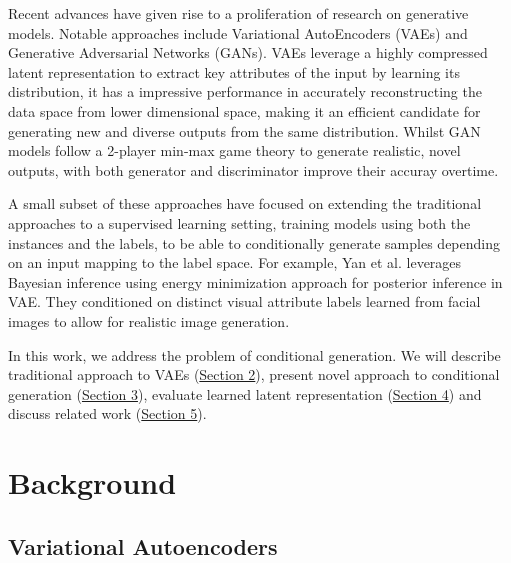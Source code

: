 \documentclass{article}
\begin{document}
 Recent advances have given rise to a proliferation of research on generative models. Notable approaches include Variational AutoEncoders (VAEs) and Generative Adversarial Networks (GANs). VAEs leverage a highly compressed latent representation to extract key attributes of the input by learning its distribution, it has a impressive performance in accurately reconstructing the data space from lower dimensional space, making it an efficient candidate for generating new and diverse outputs from the same distribution. Whilst GAN models follow a 2-player min-max game theory to generate realistic, novel outputs, with both generator and discriminator improve their accuray overtime.\par
A small subset of these approaches have focused on extending the traditional approaches to a supervised learning setting, training models using both the instances and the labels, to be able to conditionally generate samples depending on an input mapping to the label space. For example, Yan et al. leverages Bayesian inference using energy minimization approach for posterior inference in VAE. They conditioned on distinct visual attribute labels learned from facial images to allow for realistic image generation\cite{Yan}.  \par
In this work, we address the problem of conditional generation. We will describe traditional approach to VAEs (\hyperref[sec:background]{Section 2}), present novel approach to conditional generation (\hyperref[sec:proposal]{Section 3}), evaluate learned latent representation (\hyperref[sec:experiments]{Section 4}) and discuss related work (\hyperref[sec:related]{Section 5}).

\section{Background}
\label{sec:background}
\subsection{Variational Autoencoders}
\end{document}
